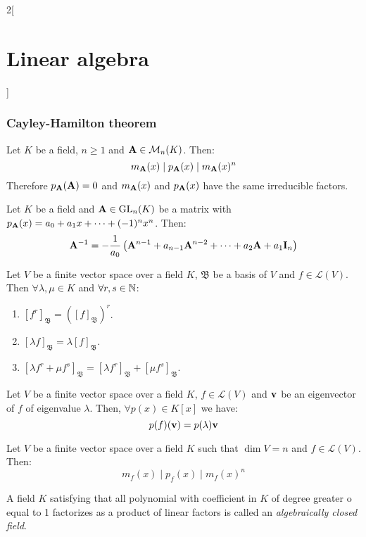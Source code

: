 \documentclass[../../../main.tex]{subfiles}
\begin{document}
\begin{multicols}{2}[\section{Linear algebra}]
  \subsubsection*{Cayley-Hamilton theorem}
  \begin{theorem}
    Let $K$ be a field, $n\geq 1$ and $\vb{A}\in\mathcal{M}_n(K)$. Then: $$m_{\vb{A}}(x)\mid p_{\vb{A}}(x)\mid m_{\vb{A}}(x)^n$$ Therefore $p_{\vb{A}}(\vb{A})=0$ and $m_{\vb{A}}(x)$ and $p_{\vb{A}}(x)$ have the same irreducible factors.
  \end{theorem}
  \begin{corollary}
    Let $K$ be a field and $\vb{A}\in\mathrm{GL}_n(K)$ be a matrix with $p_{\vb{A}}(x)=a_0+a_1x+\cdots+(-1)^nx^n$. Then: $$\vb{A}^{-1}=-\frac{1}{a_0}\left(\vb{A}^{n-1}+a_{n-1}\vb{A}^{n-2}+\cdots+a_2\vb{A}+a_1\vb{I}_n\right)$$
  \end{corollary}
  \begin{lemma}
    Let $V$ be a finite vector space over a field $K$, $\mathfrak{B}$ be a basis of $V$ and $f\in\mathcal{L}(V)$. Then $\forall\lambda,\mu\in K$ and $\forall r,s\in\mathbb{N}$:
    \begin{enumerate}
      \item $[f^r]_\mathfrak{B}={\left([f]_\mathfrak{B}\right)}^r$.
      \item $[\lambda f]_\mathfrak{B}=\lambda[f]_\mathfrak{B}$.
      \item $[\lambda f^r+\mu f^s]_\mathfrak{B}=[\lambda f^r]_\mathfrak{B}+[\mu f^s]_\mathfrak{B}$.
    \end{enumerate}
  \end{lemma}
  \begin{lemma}
    Let $V$ be a finite vector space over a field $K$, $f\in\mathcal{L}(V)$ and $\vb{v}$ be an eigenvector of $f$ of eigenvalue $\lambda$. Then, $\forall p(x)\in K[x]$ we have: $$p(f)(\vb{v})=p(\lambda)\vb{v}$$
  \end{lemma}
  \begin{theorem}
    Let $V$ be a finite vector space over a field $K$ such that $\dim V=n$ and $f\in\mathcal{L}(V)$. Then: $$m_f(x)\mid p_f(x)\mid m_f(x)^n$$
  \end{theorem}
  \begin{definition}
    A field $K$ satisfying that all polynomial with coefficient in $K$ of degree greater o equal to 1 factorizes as a product of linear factors is called an \textit{algebraically closed field}.

\end{definition}
\end{multicols}
\end{document}
